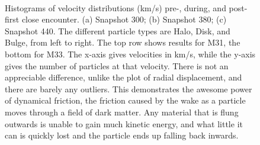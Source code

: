 \documentclass[linenumbers, ]{aastex631}
\begin{document}
\begin{figure}[ht!]
\centering
      
      
   \\
      
\caption{\label{fig:vdists} Histograms of velocity distributions (km/s) pre-, during, and post- first close encounter. (a) Snapshot 300; (b) Snapshot 380; (c) Snapshot 440. The different particle types are Halo, Disk, and Bulge, from left to right. The top row shows results for M31, the bottom for M33. The x-axis gives velocities in km/s, while the y-axis gives the number of particles at that velocity. There is not an appreciable difference, unlike the plot of radial displacement, and there are barely any outliers. This demonstrates the awesome power of dynamical friction, the friction caused by the wake as a particle moves through a field of dark matter. Any material that is flung outwards is unable to gain much kinetic energy, and what little it can is quickly lost and the particle ends up falling back inwards.}
\end{figure}
\end{document}
